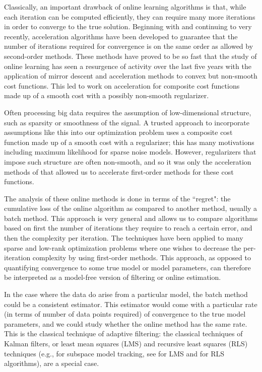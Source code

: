\documentclass[12pt]{report}
\begin{document}
Classically, an important drawback of online learning algorithms is that, while each iteration can be computed efficiently, they can require many more iterations in order to converge to the true solution. Beginning with \cite{nesterov1983method} and continuing to very recently, acceleration algorithms have been developed to guarantee that the number of iterations required for convergence is on the same order as allowed by second-order methods. These methods have proved to be so fast that the study of online learning has seen a resurgence of activity over the last five years with the application of mirror descent and acceleration methods to convex but non-smooth cost functions. This led to work on acceleration for composite cost functions made up of a smooth cost with a possibly non-smooth regularizer\cite{nesterov2013gradient,beck2009fast}.

Often processing big data requires the assumption of low-dimensional structure, such as sparsity or smoothness of the signal. A trusted approach to incorporate assumptions like this into our optimization problem uses a composite cost function made up of a smooth cost with a regularizer; this has many motivations including maximum likelihood for sparse noise models. However, regularizers that impose such structure are often non-smooth, and so it was only the acceleration methods of \cite{nesterov2013gradient,beck2009fast} that allowed us to accelerate first-order methods for these cost functions.

The analysis of these online methods is done in terms of the ``regret": the cumulative loss of the online algorithm as compared to another method, usually a batch method. This approach is very general and allows us to compare algorithms based on first the number of iterations they require to reach a certain error, and then the complexity per iteration. The techniques have been applied to many sparse and low-rank optimization problems where one wishes to decrease the per-iteration complexity by using first-order methods. This approach, as opposed to quantifying convergence to some true model or model parameters, can therefore be interpreted as a model-free version of filtering or online estimation.

In the case where the data do arise from a particular model, the batch method could be a consistent estimator. This estimator would come with a particular rate (in terms of number of data points required) of convergence to the true model parameters, and we could study whether the online method has the same rate. This is the classical technique of adaptive filtering: the classical techniques of Kalman filters, or least mean squares (LMS) and recursive least squares (RLS) techniques (e.g., for subspace model tracking, see \cite{DelmasCardoso} for LMS and \cite{yang95} for RLS algorithms), are a special case.
\end{document}
